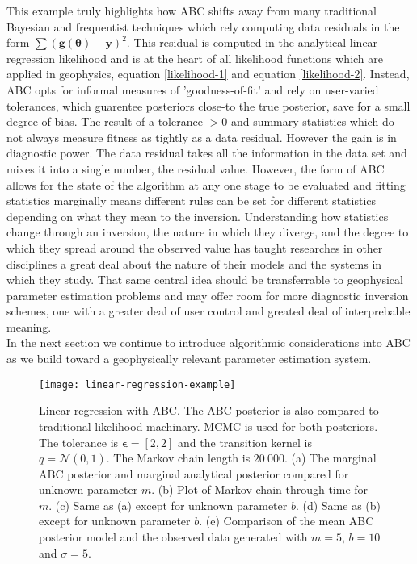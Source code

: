 This example truly highlights how ABC shifts away from many traditional Bayesian and frequentist techniques which rely computing data residuals in the form $\sum (\bm{g}(\bm{\theta})-\bm{y})^2$. This residual is computed in the analytical linear regression likelihood and is at the heart of all likelihood functions which are applied in geophysics, equation \ref{likelihood-1} and equation \ref{likelihood-2}. Instead, ABC opts for informal measures of 'goodness-of-fit' and rely on user-varied tolerances, which guarentee posteriors close-to the true posterior, save for a small degree of bias. The result of a tolerance $> 0$ and summary statistics which do not always measure fitness as tightly as a data residual. However the gain is in diagnostic power. The data residual takes all the information in the data set and mixes it into a single number, the residual value. However, the form of ABC allows for the state of the algorithm at any one stage to be evaluated and fitting statistics marginally means different rules can be set for different statistics depending on what they mean to the inversion. Understanding how statistics change through an inversion, the nature in which they diverge, and the degree to which they spread around the observed value has taught researches in other disciplines a great deal about the nature of their models and the systems in which they study. That same central idea should be transferrable to geophysical parameter estimation problems and may offer room for more diagnostic inversion schemes, one with a greater deal of user control and greated deal of interprebable meaning. \\

In the next section we continue to introduce algorithmic considerations into ABC as we build toward a geophysically relevant parameter estimation system. \\

\begin{figure}[H]
	\centering
	\texttt{[image: linear-regression-example]}
	\caption{Linear regression with ABC. The ABC posterior is also compared to traditional likelihood machinary. MCMC is used for both posteriors. The tolerance is $\bm{\epsilon} = [2,2]$ and the transition kernel is $q = \mathcal{N}(0,1)$. The Markov chain length is $20\ 000$. (a) The marginal ABC posterior and marginal analytical posterior compared for unknown parameter $m$. (b) Plot of Markov chain through time for $m$. (c) Same as (a) except for unknown parameter $b$. (d) Same as (b) except for unknown parameter $b$. (e) Comparison of the mean ABC posterior model and the observed data generated with $m = 5$, $b = 10$ and $\sigma = 5$.}
	\label{linear-regression}
\end{figure}

